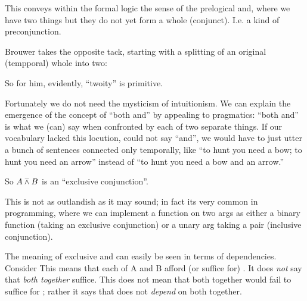 \documentclass{article}
\begin{document}
This conveys within the formal logic the sense of the prelogical and,
where we have two things but they do not yet form a whole (conjunct).
I.e. a kind of preconjunction.

Brouwer takes the opposite tack, starting with a splitting of an
original (tempporal) whole into two:


So for him, evidently, ``twoity'' is primitive.

Fortunately we do not need the mysticism of intuitionism. We can
explain the emergence of the concept of ``both and'' by appealing to
pragmatics: ``both and'' is what we (can) say when confronted by each
of two separate things. If our vocabulary lacked this locution, could
not say ``and'', we would have to just utter a bunch of sentences
connected only temporally, like ``to hunt you need a bow; to hunt you
need an arrow'' instead of ``to hunt you need a bow and an arrow.''

So \(A\barwedge B\) is an ``exclusive conjunction''.

This is not as outlandish as it may sound; in fact its very common in
programming, where we can implement a function on two args as either a
binary function (taking an exclusive conjunction) or a unary arg
taking a pair (inclusive conjunction).

The meaning of exclusive and can easily be seen in terms of
dependencies. Consider
This means that each of A and B afford (or suffice for)
\ContextD. It does \textit{not} say that \textit{both together}
suffice. This does not mean that both together would fail to suffice
for \ContextD; rather it says that \ContextD does not \textit{depend}
on both together.
\end{document}
